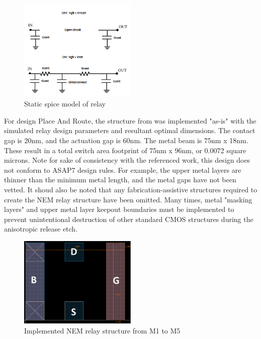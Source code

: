 \documentclass[twoside,twocolumn]{article}
\begin{document}
\begin{figure}[!hbt]
    \centering
    \includegraphics[width=0.5\textwidth]{figs/spice.png}
    \caption{Static spice model of relay}
    \label{fig:methods}
\end{figure}


For design Place And Route, the structure from \cite{OLDSIKDER} was implemented "as-is" with the simulated relay design parameters and resultant optimal dimensions. The contact gap is 20nm, and the actuation gap is 60nm. The metal beam is 75nm x 18nm. These result in a total switch area footprint of 75nm x 96nm, or 0.0072 square microns.
Note for sake of consistency with the referenced work, this design does not conform to ASAP7 design rules. For example, the upper metal layers are thinner than the minimum metal length, and the metal gaps have not been vetted.
It shoud also be noted that any fabrication-assistive structures required to create the NEM relay structure have been omitted. Many times, metal "masking layers" and upper metal layer keepout boundaries must be implemented to prevent unintentional destruction of other standard CMOS structures during the anisotropic release etch.

\begin{figure}[!hbt]
    \centering
    \includegraphics[width=0.5\textwidth]{figs/NEMlayout.png}
    \caption{Implemented NEM relay structure from M1 to M5}
    \label{fig:methods}
\end{figure}
\end{document}
